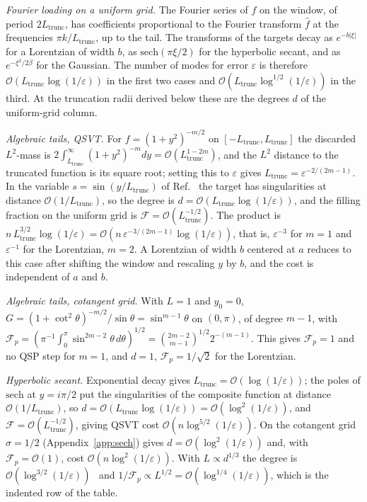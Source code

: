 \emph{Fourier loading on a uniform grid.}  The Fourier series of
$f$ on the window, of period $2L_{\mathrm{trunc}}$, has
coefficients proportional to the Fourier transform $\hat f$ at
the frequencies $\pi k/L_{\mathrm{trunc}}$, up to the tail.  The
transforms of the targets decay as $e^{-b|\xi|}$ for a Lorentzian
of width $b$, as $\mathrm{sech}(\pi\xi/2)$ for the hyperbolic
secant, and as $e^{-\xi^2/2\beta}$ for the Gaussian.  The number of
modes for error $\varepsilon$ is therefore
$\mathcal{O}(L_{\mathrm{trunc}}\log(1/\varepsilon))$ in the first
two cases and
$\mathcal{O}(L_{\mathrm{trunc}}\log^{1/2}(1/\varepsilon))$ in the
third.  At the truncation radii derived below these are the
degrees $d$ of the uniform-grid column.

\emph{Algebraic tails, QSVT.}  For $f=(1+y^2)^{-m/2}$ on
$[-L_{\mathrm{trunc}},L_{\mathrm{trunc}}]$ the discarded $L^2$-mass
is $2\int_{L_{\mathrm{trunc}}}^\infty(1+y^2)^{-m}dy=
\mathcal{O}(L_{\mathrm{trunc}}^{1-2m})$, and the $L^2$ distance to
the truncated function is its square root; setting this to
$\varepsilon$ gives
$L_{\mathrm{trunc}}=\varepsilon^{-2/(2m-1)}$.  In the variable
$s=\sin(y/L_{\mathrm{trunc}})$ of
Ref.~\cite{McArdleGilyenBerta2025} the target has singularities at
distance $\mathcal{O}(1/L_{\mathrm{trunc}})$, so the degree is
$d=\mathcal{O}(L_{\mathrm{trunc}}\log(1/\varepsilon))$, and the
filling fraction on the uniform grid is
$\mathcal{F}=\mathcal{O}(L_{\mathrm{trunc}}^{-1/2})$.  The product
is $n\,L_{\mathrm{trunc}}^{3/2}\log(1/\varepsilon)=
\mathcal{O}(n\,\varepsilon^{-3/(2m-1)}\log(1/\varepsilon))$, that
is, $\varepsilon^{-3}$ for $m=1$ and $\varepsilon^{-1}$ for the
Lorentzian, $m=2$.  A Lorentzian of width $b$ centered at $a$
reduces to this case after shifting the window and rescaling $y$
by $b$, and the cost is independent of $a$ and $b$.

\emph{Algebraic tails, cotangent grid.}  With $L=1$ and $y_0=0$,
$G=(1+\cot^2\theta)^{-m/2}/\sin\theta=\sin^{m-1}\theta$ on
$(0,\pi)$, of degree $m-1$, with
$\mathcal{F}_p=(\pi^{-1}\int_0^\pi\sin^{2m-2}\theta\,d\theta)^{1/2}
=\binom{2m-2}{m-1}^{1/2}2^{-(m-1)}$.  This gives $\mathcal{F}_p=1$
and no QSP step for $m=1$, and $d=1$, $\mathcal{F}_p=1/\sqrt2$ for
the Lorentzian.

\emph{Hyperbolic secant.}  Exponential decay gives
$L_{\mathrm{trunc}}=\mathcal{O}(\log(1/\varepsilon))$; the poles of
$\mathrm{sech}$ at $y=i\pi/2$ put the singularities of the
composite function at distance $\mathcal{O}(1/L_{\mathrm{trunc}})$, so
$d=\mathcal{O}(L_{\mathrm{trunc}}\log(1/\varepsilon))=
\mathcal{O}(\log^2(1/\varepsilon))$, and
$\mathcal{F}=\mathcal{O}(L_{\mathrm{trunc}}^{-1/2})$, giving QSVT cost
$\mathcal{O}(n\log^{5/2}(1/\varepsilon))$.  On the cotangent grid
$\sigma=1/2$ (Appendix~\ref{app:sech}) gives
$d=\mathcal{O}(\log^2(1/\varepsilon))$ and, with
$\mathcal{F}_p=\mathcal{O}(1)$, cost
$\mathcal{O}(n\log^2(1/\varepsilon))$.  With $L\propto d^{1/3}$
the degree is
$\mathcal{O}(\log^{3/2}(1/\varepsilon))$~\cite[Sec.~17.9]{Boyd2001}
and $1/\mathcal{F}_p\propto L^{1/2}=
\mathcal{O}(\log^{1/4}(1/\varepsilon))$, which is the indented row
of the table.

